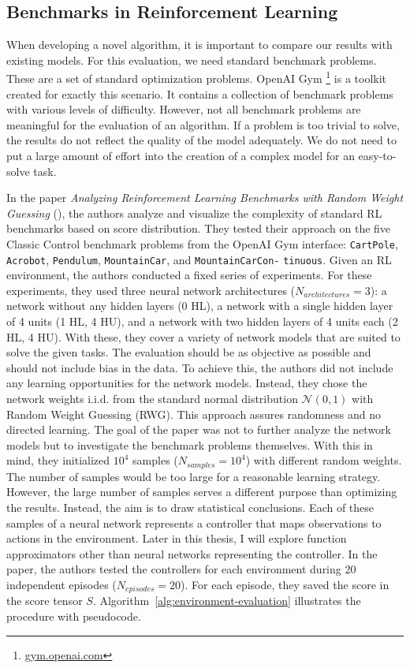 \subsection{Benchmarks in Reinforcement Learning}
\label{ssec:benchmarks}
When developing a novel algorithm, it is important to compare our results with existing models. For this evaluation, we need standard benchmark problems. These are a set of standard optimization problems. OpenAI Gym \footnote{\url{gym.openai.com}} is a toolkit created for exactly this scenario. It contains a collection of benchmark problems with various levels of difficulty. However, not all benchmark problems are meaningful for the evaluation of an algorithm. If a problem is too trivial to solve, the results do not reflect the quality of the model adequately. We do not need to put a large amount of effort into the creation of a complex model for an easy-to-solve task.

In the paper \emph{Analyzing Reinforcement Learning Benchmarks with Random Weight Guessing} (\citet{oller_analyzing_2020}), the authors analyze and visualize the complexity of standard RL benchmarks based on score distribution. They tested their approach on the five Classic Control benchmark problems from the OpenAI Gym interface: \verb|CartPole|, \verb|Acrobot|, \verb|Pendulum|, \verb|MountainCar|, and \verb|MountainCarCon-| \verb|tinuous|. Given an RL environment, the authors conducted a fixed series of experiments. For these experiments, they used three neural network architectures ($N_{architectures}=3$): a network without any hidden layers (0 HL), a network with a single hidden layer of 4 units (1 HL, 4 HU), and a network with two hidden layers of 4 units each (2 HL, 4 HU). With these, they cover a variety of network models that are suited to solve the given tasks. The evaluation should be as objective as possible and should not include bias in the data. To achieve this, the authors did not include any learning opportunities for the network models. Instead, they chose the network weights i.i.d. from the standard normal distribution $\mathcal{N}(0,1)$ with Random Weight Guessing (RWG). This approach assures randomness and no directed learning. The goal of the paper was not to further analyze the network models but to investigate the benchmark problems themselves. With this in mind, they initialized $10^4$ samples ($N_{samples}=10^4$) with different random weights. The number of samples would be too large for a reasonable learning strategy. However, the large number of samples serves a different purpose than optimizing the results. Instead, the aim is to draw statistical conclusions. Each of these samples of a neural network represents a controller that maps observations to actions in the environment. Later in this thesis, I will explore function approximators other than neural networks representing the controller. In the paper, the authors tested the controllers for each environment during 20 independent episodes ($N_{episodes}=20$). For each episode, they saved the score in the score tensor $S$. Algorithm~\ref{alg:environment-evaluation} illustrates the procedure with pseudocode.

